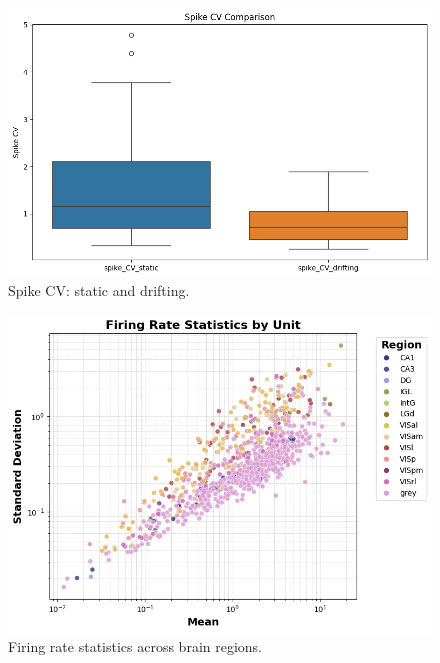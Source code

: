 \documentclass[10pt,twocolumn]{article}
\begin{document}
\begin{figure}[ht]
\centering
\includegraphics[width=0.85\linewidth]{report_images/spike_CV_comparison.png}
\caption{Spike CV: static and drifting.}
\label{fig:spike_cv}
\end{figure}

\begin{figure}[ht]
\centering
\includegraphics[width=\linewidth]{report_images/unit_firing_rate_statistics.png}
\caption{Firing rate statistics across brain regions.}
\label{fig:firing_rate_stats}
\end{figure}
\end{document}
